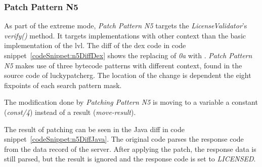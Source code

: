 \subsubsection{Patch Pattern N5}
As part of the extreme mode, \textit{Patch Pattern N5} targets the \textit{LicenseValidator}'s \textit{verify()} method.
It targets implementations with other context than the basic implementation of the \gls{lvl}.
\newline
The diff of the dex code in code snippet~\ref{codeSnippet:n5DiffDex} shows the replacing of \textit{0a} with .
\textit{Patch Pattern N5} makes use of three bytecode patterns with different context, found in the source code of \gls{luckypatcherg}.
The location of the change is dependent the eight fixpoints of each search pattern mask.
\newline

The modification done by \textit{Patching Pattern N5} is moving to a variable a constant (\textit{const/4}) instead of a result (\textit{move-result}).
\newline

The result of patching can be seen in the Java diff in code snippet~\ref{codeSnippet:n5DiffJava}.
The original code parses the response code from the data record of the server.
After applying the patch, the response data is still parsed, but the result is ignored and the response code is set to \textit{LICENSED}.
\newline


